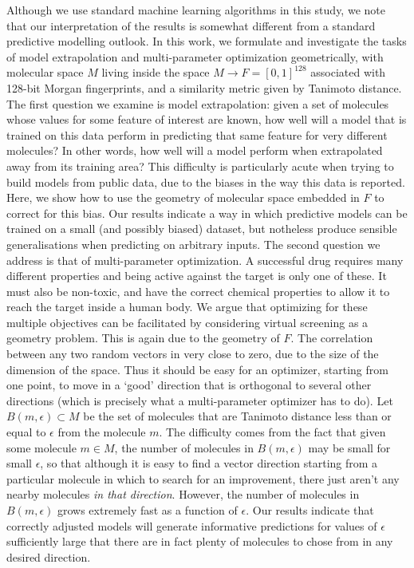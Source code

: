 \documentclass{article}
\begin{document}
Although we use standard machine learning algorithms in this study, we note that our interpretation of the results is somewhat different from a standard predictive modelling outlook. 
In this work, we formulate and investigate  the tasks of model extrapolation and multi-parameter optimization geometrically, with molecular space $M$ living inside the space $M \to F = [0, 1]^{128}$ associated with 128-bit Morgan fingerprints, and a similarity metric given by Tanimoto distance. 
\newline
\newline
The first question we examine is model extrapolation: given a set of molecules whose values for some feature of interest are known, how well will a model that is trained on this data perform in predicting that same feature for very different molecules? In other words, how well will a model perform when extrapolated away from its training area? This difficulty is particularly acute when trying to build models from public data, due to the biases in the way this data is reported\cite{Kalliokoski2013,Tiikkainen2013}. Here, we show how to use the geometry of molecular space embedded in $F$ to correct for this bias. Our results indicate a way in which predictive models can be trained on a small (and possibly biased) dataset, but notheless produce sensible generalisations when predicting on arbitrary inputs.
\newline
\newline
The second question we address is that of multi-parameter optimization.  A successful drug requires many different properties and being active against the target is only one of these.  It must also be non-toxic, and have the correct chemical properties to allow it to reach the target inside a human body.  We argue that optimizing for these multiple objectives can be facilitated by considering virtual screening as a geometry problem.
This is again due to the geometry of $F$. The correlation between any two random vectors in very close to zero, due to the size of the dimension of the space.  Thus it should be easy for an optimizer, starting from one point, to move in a `good' direction that is orthogonal to several other directions (which is precisely what a multi-parameter optimizer has to do).  Let $B(m, \epsilon) \subset M$ be the set of molecules that are Tanimoto distance less than or equal to $\epsilon$ from the molecule $m$.  The difficulty comes from the fact that given some molecule $m \in M$, the number of molecules in  $B(m, \epsilon)$ may be small for small $\epsilon$, so that although it is easy to find a vector direction starting from a particular molecule in which to search for an improvement, there just aren't any nearby molecules \textit{in that direction}. However, the number of molecules in $B(m, \epsilon)$ grows extremely fast as a function of $\epsilon$.  Our results indicate that correctly adjusted models will generate informative predictions for values of $\epsilon$ sufficiently large that there are in fact plenty of molecules to chose from in any desired direction.
\end{document}
